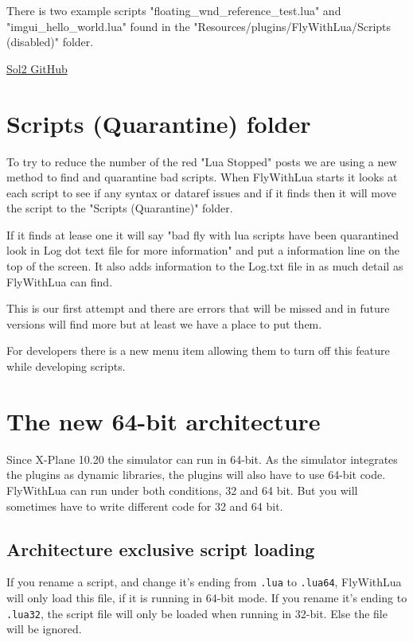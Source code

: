 \documentclass[11pt,parskip=half,a4paper]{scrartcl}
\begin{document}
There is two example scripts "floating\_wnd\_reference\_test.lua" and "imgui\_hello\_world.lua" found in the "Resources/plugins/FlyWithLua/Scripts (disabled)" folder.

\href{https://github.com/ThePhD/sol2}{Sol2 GitHub}


\section{Scripts (Quarantine) folder}

To try to reduce the number of the red "Lua Stopped" posts we are using a new method to find and quarantine bad scripts. When FlyWithLua starts it looks at each script to see if any syntax or dataref issues and if it finds then it will move the script to the "Scripts (Quarantine)" folder. \newline

If it finds at lease one it will say "bad fly with lua scripts have been quarantined look in Log dot text file for more information" and put a information line on the top of the screen. It also adds information to the Log.txt file in as much detail as FlyWithLua can find. \newline

This is our first attempt and there are errors that will be missed and in future versions will find more but at least we have a place to put them. \newline

For developers there is a new menu item allowing them to turn off this feature while developing scripts.


\newpage
\section{The new 64-bit architecture}

Since X-Plane 10.20 the simulator can run in 64-bit. As the simulator integrates the plugins as dynamic libraries, the plugins will also have to use 64-bit code. FlyWithLua can run under both conditions, 32 and 64 bit. But you will sometimes have to write different code for 32 and 64 bit.

\subsection{Architecture exclusive script loading}

If you rename a script, and change it's ending from \verb|.lua| to \verb|.lua64|, FlyWithLua will only load this file, if it is running in 64-bit mode. If you rename it's ending to \verb|.lua32|, the script file will only be loaded when running in 32-bit. Else the file will be ignored.
\end{document}
